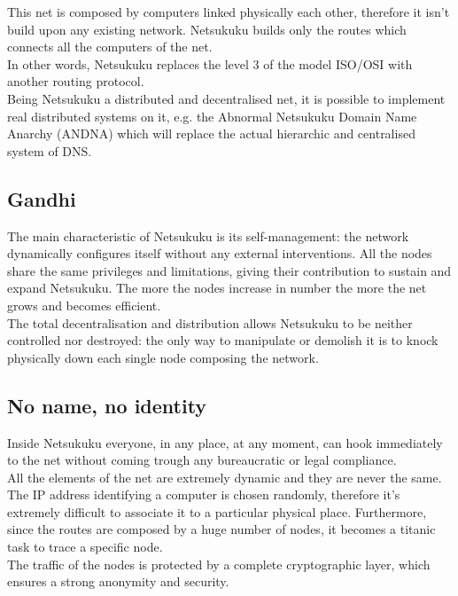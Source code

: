 \documentclass[a4paper]{article}
\begin{document}
This net is composed by computers linked physically each other, therefore
it isn't build upon any existing network. Netsukuku builds only the routes
which connects all the computers of the net.\\

In other words, Netsukuku replaces the level 3 of the model ISO/OSI with
another routing protocol.\\

Being Netsukuku a distributed and decentralised net, it is possible to
implement real distributed systems on it, e.g. the Abnormal Netsukuku Domain
Name Anarchy (ANDNA)\cite{andnadoc} which will replace the actual hierarchic
and centralised system of DNS.

\subsection{Gandhi}

The main characteristic of Netsukuku is its self-management: the network
dynamically configures itself without any external interventions.
All the nodes share the same privileges and limitations, giving their
contribution to sustain and expand Netsukuku. The more the nodes increase
in number the more the net grows and becomes efficient.\\

The total decentralisation and distribution allows Netsukuku to be
neither controlled nor destroyed: the only way to manipulate or demolish
it is to knock physically down each single node composing the network.

\subsection{No name, no identity}

Inside Netsukuku everyone, in any place, at any moment, can hook immediately
to the net without coming trough any bureaucratic or legal compliance.\\

All the elements of the net are extremely dynamic and they are never the same.
The IP address identifying a computer is chosen randomly, therefore it's
extremely difficult to associate it to a particular physical place. Furthermore,
since the routes are composed by a huge number of nodes, it becomes a titanic
task to trace a specific node.\\

The traffic of the nodes is protected by a complete cryptographic
layer\cite{carciofo}, which ensures a strong anonymity and security.
\end{document}
